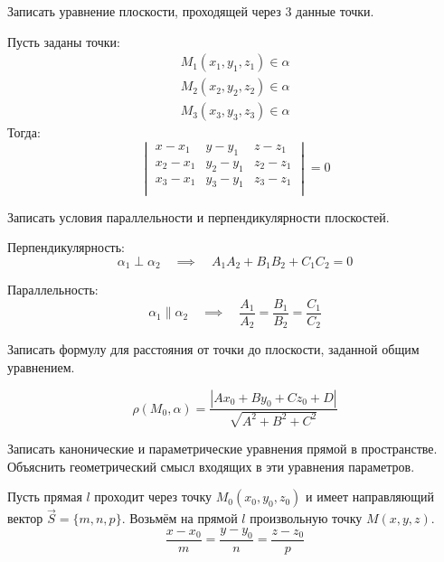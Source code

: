 \begin{question}
  Записать уравнение плоскости, проходящей через 3 данные точки.
\end{question}
\begin{answer}
  Пусть заданы точки:
  \begin{gather*}
    M_1(x_1, y_1, z_1) \in \alpha \\
    M_2(x_2, y_2, z_2) \in \alpha \\
    M_3(x_3, y_3, z_3) \in \alpha 
  \end{gather*}
  Тогда: \[
    \begin{vmatrix}
      x - x_1 & y - y_1 & z - z_1 \\
      x_2 - x_1 & y_2 - y_1 & z_2 - z_1 \\
      x_3 - x_1 & y_3 - y_1 & z_3 - z_1 \\
    \end{vmatrix} = 0
\]
\end{answer}

\begin{question}
  Записать условия параллельности и перпендикулярности плоскостей.
\end{question}
\begin{answer}
  Перпендикулярность: \[
    \alpha_1 \perp \alpha_2 \quad \implies \quad
    A_1 A_2 + B_1 B_2 + C_1 C_2 = 0
  \] 
  
  Параллельность: \[
    \alpha_1 \parallel \alpha_2 \quad \implies \quad
    \frac{A_1}{A_2} = \frac{B_1}{B_2} = \frac{C_1}{C_2}
  \]
\end{answer}


\begin{question}
  Записать формулу для расстояния от точки до плоскости, заданной общим уравнением.
\end{question}
\begin{answer}
  \[
    \rho(M_0, \alpha) = \frac{|Ax_0 + By_0 + Cz_0 + D| }{\sqrt{A^2 + B^2 + C^2}} 
  \] 
\end{answer}


\begin{question}
  Записать канонические и параметрические уравнения прямой в пространстве. Объяснить геометрический смысл входящих в эти уравнения параметров.
\end{question}
\begin{answer}
  Пусть прямая $l$ проходит через точку $M_0\left(x_0, y_0, z_0 \right)$ и имеет направляющий вектор $\vec{S} = \{m, n, p\}$.
Возьмём на прямой $l$ произвольную точку $M(x, y, z)$.
  \[
  \frac{x - x_0}{m} = \frac{y - y_0}{n} = \frac{z - z_0}{p}
  \] 
\end{answer}

